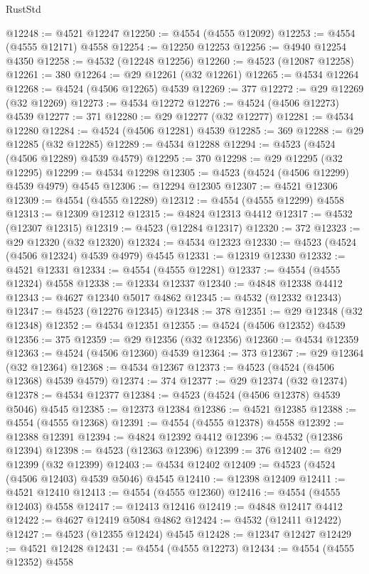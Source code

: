 \begin{lexlean}{RustStd}
\begin{coremodule}
@12248 := @4521 @12247
@12250 := @4554 (@4555 @12092)
@12253 := @4554 (@4555 @12171) @4558
@12254 := @12250 @12253
@12256 := @4940 @12254 @4350
@12258 := @4532 (@12248 @12256)
@12260 := @4523 (@12087 @12258)
@12261 := 380
@12264 := @29 @12261 (@32 @12261)
@12265 := @4534 @12264
@12268 := @4524 (@4506 @12265) @4539
@12269 := 377
@12272 := @29 @12269 (@32 @12269)
@12273 := @4534 @12272
@12276 := @4524 (@4506 @12273) @4539
@12277 := 371
@12280 := @29 @12277 (@32 @12277)
@12281 := @4534 @12280
@12284 := @4524 (@4506 @12281) @4539
@12285 := 369
@12288 := @29 @12285 (@32 @12285)
@12289 := @4534 @12288
@12294 := @4523 (@4524 (@4506 @12289) @4539 @4579)
@12295 := 370
@12298 := @29 @12295 (@32 @12295)
@12299 := @4534 @12298
@12305 := @4523 (@4524 (@4506 @12299) @4539 @4979) @4545
@12306 := @12294 @12305
@12307 := @4521 @12306
@12309 := @4554 (@4555 @12289)
@12312 := @4554 (@4555 @12299) @4558
@12313 := @12309 @12312
@12315 := @4824 @12313 @4412
@12317 := @4532 (@12307 @12315)
@12319 := @4523 (@12284 @12317)
@12320 := 372
@12323 := @29 @12320 (@32 @12320)
@12324 := @4534 @12323
@12330 := @4523 (@4524 (@4506 @12324) @4539 @4979) @4545
@12331 := @12319 @12330
@12332 := @4521 @12331
@12334 := @4554 (@4555 @12281)
@12337 := @4554 (@4555 @12324) @4558
@12338 := @12334 @12337
@12340 := @4848 @12338 @4412
@12343 := @4627 @12340 @5017 @4862
@12345 := @4532 (@12332 @12343)
@12347 := @4523 (@12276 @12345)
@12348 := 378
@12351 := @29 @12348 (@32 @12348)
@12352 := @4534 @12351
@12355 := @4524 (@4506 @12352) @4539
@12356 := 375
@12359 := @29 @12356 (@32 @12356)
@12360 := @4534 @12359
@12363 := @4524 (@4506 @12360) @4539
@12364 := 373
@12367 := @29 @12364 (@32 @12364)
@12368 := @4534 @12367
@12373 := @4523 (@4524 (@4506 @12368) @4539 @4579)
@12374 := 374
@12377 := @29 @12374 (@32 @12374)
@12378 := @4534 @12377
@12384 := @4523 (@4524 (@4506 @12378) @4539 @5046) @4545
@12385 := @12373 @12384
@12386 := @4521 @12385
@12388 := @4554 (@4555 @12368)
@12391 := @4554 (@4555 @12378) @4558
@12392 := @12388 @12391
@12394 := @4824 @12392 @4412
@12396 := @4532 (@12386 @12394)
@12398 := @4523 (@12363 @12396)
@12399 := 376
@12402 := @29 @12399 (@32 @12399)
@12403 := @4534 @12402
@12409 := @4523 (@4524 (@4506 @12403) @4539 @5046) @4545
@12410 := @12398 @12409
@12411 := @4521 @12410
@12413 := @4554 (@4555 @12360)
@12416 := @4554 (@4555 @12403) @4558
@12417 := @12413 @12416
@12419 := @4848 @12417 @4412
@12422 := @4627 @12419 @5084 @4862
@12424 := @4532 (@12411 @12422)
@12427 := @4523 (@12355 @12424) @4545
@12428 := @12347 @12427
@12429 := @4521 @12428
@12431 := @4554 (@4555 @12273)
@12434 := @4554 (@4555 @12352) @4558

\end{coremodule}
\end{lexlean}
